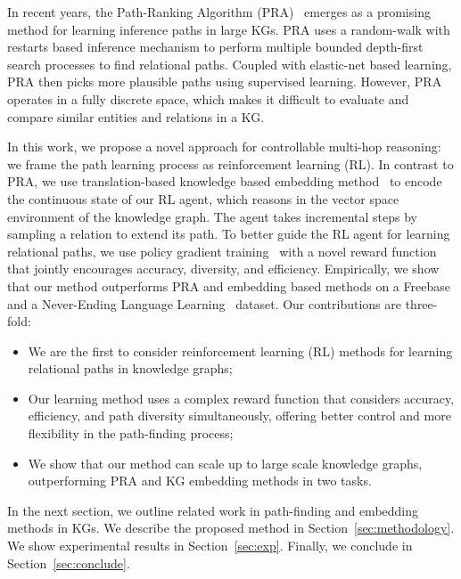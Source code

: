 \documentclass[11pt,letterpaper]{article}
\begin{document}
In recent years, the Path-Ranking Algorithm (PRA)~\cite{lao2010efficient,lao2011random} emerges as a promising method for learning inference paths in large KGs. PRA uses a random-walk with restarts based inference mechanism to perform multiple bounded depth-first search processes to find relational paths. Coupled with elastic-net based learning, PRA then picks more plausible paths using supervised learning. However, PRA operates in a fully discrete space, which makes it difficult to evaluate and compare similar entities and relations in a KG. 

In this work, we propose a novel approach for controllable multi-hop reasoning: we frame the path learning process as reinforcement learning (RL). In contrast to PRA, we use translation-based knowledge based embedding method~\cite{bordes2013translating} to encode the continuous state of our RL agent, which reasons in the vector space environment of the knowledge graph. The agent takes incremental steps by sampling a relation to extend its path.
To better guide the RL agent for learning relational paths, we use policy gradient training~\cite{mnih2015human} with a novel reward function that jointly encourages accuracy, diversity, and efficiency. Empirically, we show that our method outperforms PRA and embedding based methods on a Freebase and a Never-Ending Language Learning~\cite{DBLP:conf/aaai/CarlsonBKSHM10} dataset. Our contributions are three-fold:
\begin{itemize}
\item We are the first to consider reinforcement learning (RL) methods for learning relational paths in knowledge graphs;
\item Our learning method uses a complex reward function that considers accuracy, efficiency, and path diversity simultaneously, offering better control and more flexibility in the path-finding process;
\item We show that our method can scale up to large scale knowledge graphs, outperforming PRA and KG embedding methods in two tasks.
\end{itemize}
In the next section, we outline related work in path-finding and embedding methods in KGs. We describe the proposed method in Section~\ref{sec:methodology}. We show experimental results in Section~\ref{sec:exp}. Finally, we conclude in Section~\ref{sec:conclude}.
\end{document}
